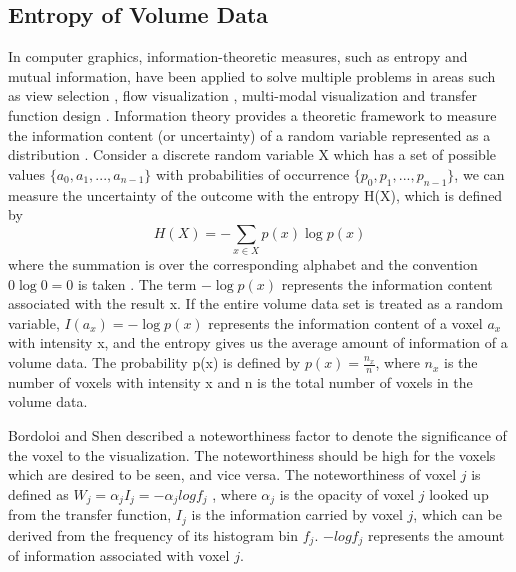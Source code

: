 \documentclass{egpubl}
\begin{document}
\subsection{Entropy of Volume Data}
In computer graphics, information-theoretic measures, such as entropy and mutual information, have been applied to solve multiple problems in areas such as view selection \cite{bordoloi_view_2005} 
\cite{bramon_information-theoretic_2013}, flow visualization \cite{xu_information-theoretic_2010}, multi-modal visualization \cite{haidacher_information-based_2008} \cite{bramon_information_2013} and transfer function design \cite{bruckner_isosurface_2010} \cite{ip_hierarchical_2012}.
Information theory provides a theoretic framework to measure the information content (or uncertainty) of a random variable represented as a distribution \cite{wang_information_2011}.
Consider a discrete random variable X which has a set of possible values $\{a_{0},a_{1},...,a_{n-1} \}$ with probabilities of occurrence $\{ p_{0},p_{1},...,p_{n-1} \}$, we can measure the uncertainty of the outcome with the entropy H(X), which is defined by
\[  H(X)=-\sum_{x \in X} p(x) \log p(x) 
\]
where the summation is over the corresponding alphabet and the convention $ 0\log 0=0 $ is taken%
.
The term $ -\log p(x) $ represents the information content associated with the result x.
If the entire volume data set is treated as a random variable, $ I(a_{x})=-\log p(x) $ represents the information content of a voxel $ a_{x} $ with intensity x, and the entropy gives us the average amount of information of a volume data.
The probability p(x) is defined by
$ p(x)=\frac{n_{x}}{n} $, where $ n_{x} $ is the number of voxels with intensity x and n is the total number of voxels in the volume data.


Bordoloi and Shen \cite{bordoloi_view_2005} described a noteworthiness factor to denote the significance of the voxel to the visualization.
The noteworthiness should be high for the voxels which are desired to be seen, and vice versa. The noteworthiness of voxel $ j $ is defined as
$ W_{j}=\alpha_{j}I_{j}=-\alpha_{j}log f_{j} $
, where $ \alpha_{j} $ is the opacity of voxel $ j $ looked up from the transfer function, $ I_{j} $ is the information carried by voxel $ j $, which can be derived from the frequency of its histogram bin $ f_{j} $. $ -log f_{j} $ represents the amount of information associated with voxel $ j $.


\end{document}
